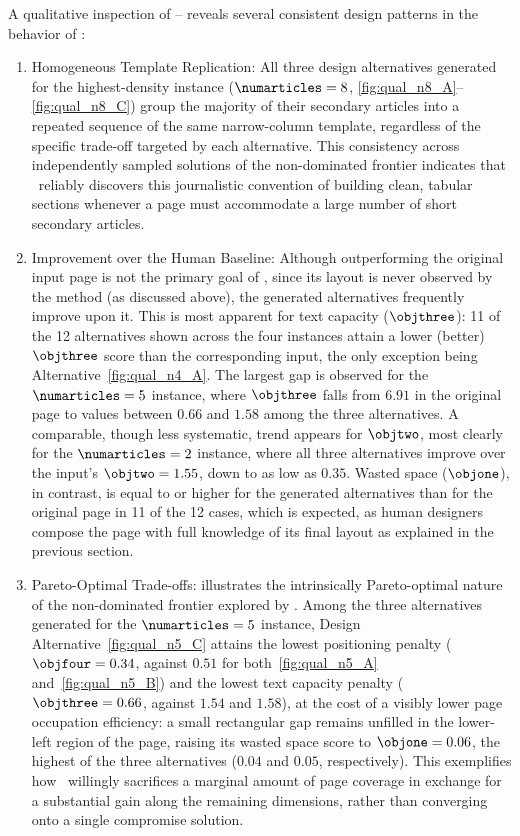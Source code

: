 A qualitative inspection of -- reveals several consistent design patterns in the behavior of \methodName:
\begin{enumerate}
    \item Homogeneous Template Replication: All three design alternatives generated for the highest-density instance ($\numarticles=8$, \ref{fig:qual_n8_A}--\ref{fig:qual_n8_C}) group the majority of their secondary articles into a repeated sequence of the same narrow-column template, regardless of the specific trade-off targeted by each alternative. This consistency across independently sampled solutions of the non-dominated frontier indicates that \methodName\ reliably discovers this journalistic convention of building clean, tabular sections whenever a page must accommodate a large number of short secondary articles.

    \item Improvement over the Human Baseline: Although outperforming the original input page is not the primary goal of \methodName, since its layout is never observed by the method (as discussed above), the generated alternatives frequently improve upon it. This is most apparent for text capacity ($\objthree$): 11 of the 12 alternatives shown across the four instances attain a lower (better) $\objthree$ score than the corresponding input, the only exception being Alternative~\ref{fig:qual_n4_A}. The largest gap is observed for the $\numarticles=5$ instance, where $\objthree$ falls from $6.91$ in the original page to values between $0.66$ and $1.58$ among the three alternatives. A comparable, though less systematic, trend appears for $\objtwo$, most clearly for the $\numarticles=2$ instance, where all three alternatives improve over the input's $\objtwo = 1.55$, down to as low as $0.35$. Wasted space ($\objone$), in contrast, is equal to or higher for the generated alternatives than for the original page in 11 of the 12 cases, which is expected, as human designers compose the page with full knowledge of its final layout as explained in the previous section.

    \item Pareto-Optimal Trade-offs:  illustrates the intrinsically Pareto-optimal nature of the non-dominated frontier explored by \methodName. Among the three alternatives generated for the $\numarticles=5$ instance, Design Alternative~\ref{fig:qual_n5_C} attains the lowest positioning penalty ($\objfour = 0.34$, against $0.51$ for both~\ref{fig:qual_n5_A} and~\ref{fig:qual_n5_B}) and the lowest text capacity penalty ($\objthree = 0.66$, against $1.54$ and $1.58$), at the cost of a visibly lower page occupation efficiency: a small rectangular gap remains unfilled in the lower-left region of the page, raising its wasted space score to $\objone = 0.06$, the highest of the three alternatives ($0.04$ and $0.05$, respectively). This exemplifies how \methodName\ willingly sacrifices a marginal amount of page coverage in exchange for a substantial gain along the remaining dimensions, rather than converging onto a single compromise solution.
\end{enumerate}
